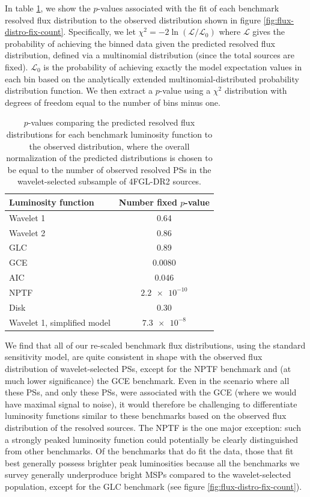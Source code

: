 \documentclass[letter,11pt]{article}
\begin{document}
In table \ref{tab:histogram-fits}, we show the $p$-values associated with the fit of each benchmark resolved flux distribution to the observed distribution shown in figure \ref{fig:flux-distro-fix-count}. Specifically, we let  $\chi^2 = -2\ln(\mathcal{L} / \mathcal{L}_0)$ where $\mathcal{L}$ gives the probability of achieving the binned data given the predicted resolved flux distribution, defined via a multinomial distribution (since the total sources are fixed). $\mathcal{L}_0$ is the probability of achieving exactly the model expectation values in each bin based on the analytically extended multinomial-distributed probability distribution function. We then extract a $p$-value using a $\chi^2$ distribution with degrees of freedom equal to the number of bins minus one.

\begin{table}
    \begin{tabular} {|l | c |}
    \hline
    Luminosity function & Number fixed $p$-value\\ \hline \hline
    Wavelet 1 & 0.64 \\
    Wavelet 2 & 0.86 \\
    GLC & 0.89 \\
    GCE & 0.0080 \\
    AIC & 0.046 \\
    NPTF & $\num{2.2e-10}$ \\
    Disk & 0.30 \\
    Wavelet 1, simplified model & $\num{7.3e-8}$ \\ \hline
    \end{tabular}
    \centering
    \caption{$p$-values comparing the predicted resolved flux distributions for each benchmark luminosity function to the observed distribution, where the overall normalization of the predicted distributions is chosen to be equal to the number of observed resolved PSs in the wavelet-selected subsample of 4FGL-DR2 sources.}
    \label{tab:histogram-fits}
\end{table}

We find that all of our re-scaled benchmark flux distributions, using the standard sensitivity model, are quite consistent in shape with the observed flux distribution of wavelet-selected PSs, except for the NPTF benchmark and (at much lower significance) the GCE benchmark. Even in the scenario where all these PSs, and only these PSs, were associated with the GCE (where we would have maximal signal to noise), it would therefore be challenging to differentiate luminosity functions similar to these benchmarks based on the observed flux distribution of the resolved sources. The NPTF is the one major exception: such a strongly peaked luminosity function could potentially be clearly distinguished from other benchmarks. Of the benchmarks that do fit the data, those that fit best generally possess brighter peak luminosities because all the benchmarks we survey generally underproduce bright MSPs compared to the wavelet-selected population, except for the GLC benchmark (see figure \ref{fig:flux-distro-fix-count}).
\end{document}

